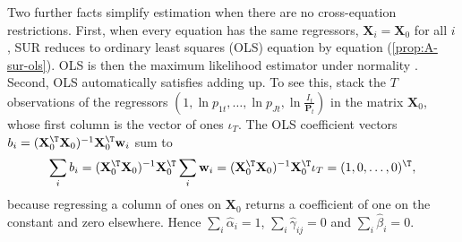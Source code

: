 Two further facts simplify estimation when there are no cross-equation restrictions. First, when every
equation has the same regressors, $\mathbf{X}_i = \mathbf{X}_0$ for all $i$, SUR reduces to ordinary least
squares (OLS) equation by equation (\cref{prop:A-sur-ols}). OLS is then the maximum likelihood estimator
under normality \citep[p.~316]{DeatonMuellbauer1980a}. Second, OLS automatically satisfies adding up. To see
this, stack the $T$ observations of the regressors $(1, \ln p_{1t}, \dots, \ln p_{Jt},
\ln\frac{I_t}{\mathbf{P}_t})$ in the matrix $\mathbf{X}_0$, whose first column is the vector of ones $\iota_T$.
The OLS coefficient vectors $b_i = (\mathbf{X}_0^{\T}\mathbf{X}_0)^{-1}\mathbf{X}_0^{\T}\mathbf{w}_i$ sum to
\begin{equation*}
  \sum_i b_i = (\mathbf{X}_0^{\T}\mathbf{X}_0)^{-1}\mathbf{X}_0^{\T}\sum_i \mathbf{w}_i
  = (\mathbf{X}_0^{\T}\mathbf{X}_0)^{-1}\mathbf{X}_0^{\T}\iota_T = (1, 0, \dots, 0)^{\T},
\end{equation*}
because regressing a column of ones on $\mathbf{X}_0$ returns a coefficient of one on the constant and zero
elsewhere. Hence $\sum_i\hat\alpha_i = 1$, $\sum_i\hat\gamma_{ij} = 0$ and $\sum_i\hat\beta_i = 0$.

